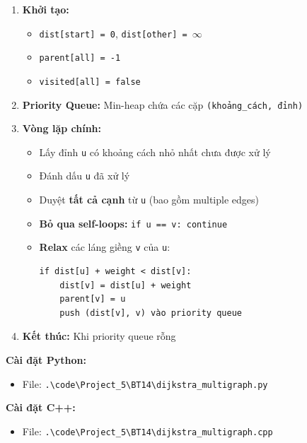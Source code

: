 \documentclass[12pt,a4paper]{article}
\begin{document}
\begin{enumerate}
    \item \textbf{Khởi tạo:}
    \begin{itemize}[label=\textbullet]
        \item \texttt{dist[start] = 0}, \texttt{dist[other] = $\infty$}
        \item \texttt{parent[all] = -1}
        \item \texttt{visited[all] = false}
    \end{itemize}

    \item \textbf{Priority Queue:} Min-heap chứa các cặp \texttt{(khoảng\_cách, đỉnh)}

    \item \textbf{Vòng lặp chính:}
    \begin{itemize}[label=\textbullet]
        \item Lấy đỉnh \texttt{u} có khoảng cách nhỏ nhất chưa được xử lý
        \item Đánh dấu \texttt{u} đã xử lý
        \item Duyệt \textbf{tất cả cạnh} từ \texttt{u} (bao gồm multiple edges)
        \item \textbf{Bỏ qua self-loops:} \texttt{if u == v: continue}
        \item \textbf{Relax} các láng giềng \texttt{v} của \texttt{u}:
        \begin{verbatim}
if dist[u] + weight < dist[v]:
    dist[v] = dist[u] + weight
    parent[v] = u
    push (dist[v], v) vào priority queue
        \end{verbatim}
    \end{itemize}

    \item \textbf{Kết thúc:} Khi priority queue rỗng
\end{enumerate}


\textbf{Cài đặt Python:}
\begin{itemize}[label=\textbullet]
   \item File: \texttt{.\textbackslash code\textbackslash Project\_5\textbackslash BT14\textbackslash dijkstra\_multigraph.py}
\end{itemize}

\textbf{Cài đặt C++:}
\begin{itemize}[label=\textbullet]
   \item File: \texttt{.\textbackslash code\textbackslash Project\_5\textbackslash BT14\textbackslash dijkstra\_multigraph.cpp}
\end{itemize}
\end{document}
